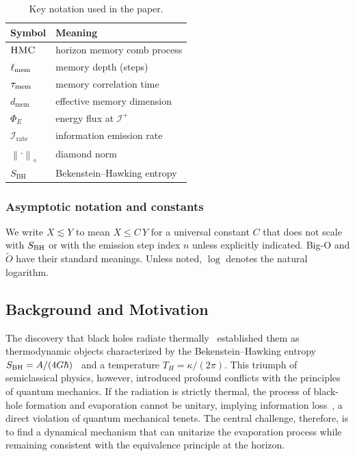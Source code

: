 \documentclass[11pt,a4paper]{article}
\newcommand{\normD}[1]{\left\lVert #1 \right\rVert_{\diamond}}
\newcommand{\Irate}{\mathcal{I}_{\mathrm{rate}}}
\newcommand{\Eflux}{\Phi_E}
\newcommand{\Ddiamond}[1]{\normD{#1}}
\newcommand{\HMC}{\textsc{HMC}\xspace}
\newcommand{\dmem}{\ensuremath{d_{\mathrm{mem}}}}
\newcommand{\SBH}{\ensuremath{S_{\mathrm{BH}}}}
\theoremstyle{plain}
\theoremstyle{definition}
\theoremstyle{remark}
\begin{document}
\begin{table}[t]
  \centering
  \caption{Key notation used in the paper.}
  \label{tab:notation}
  \small
  \begin{tabular*}{\textwidth}{@{\extracolsep{\fill}}ll@{}}
    \toprule
    \textbf{Symbol} & \textbf{Meaning} \\
    \midrule
    $\HMC$ & horizon memory comb process \\
    $\ell_{\rm mem}$ & memory depth (steps) \\
    $\tau_{\rm mem}$ & memory correlation time \\
    $\dmem$ & effective memory dimension \\
    $\Eflux$ & energy flux at $\mathscr{I}^+$ \\
    $\Irate$ & information emission rate \\
    $\Ddiamond{\cdot}$ & diamond norm \\
    $\SBH$ & Bekenstein--Hawking entropy \\
    \bottomrule
  \end{tabular*}
\end{table}

\subsubsection{Asymptotic notation and constants}
We write $X\lesssim Y$ to mean $X\le C\,Y$ for a universal constant $C$ that does not scale with $S_{\rm BH}$
or with the emission step index $n$ unless explicitly indicated. Big-O and $\tilde O$ have their standard
meanings. Unless noted, $\log$ denotes the natural logarithm.

\subsection{Background and Motivation}
The discovery that black holes radiate thermally~\cite{Hawking:1975} established them as thermodynamic objects characterized by the Bekenstein--Hawking entropy $S_{\rm BH} = A/(4G\hbar)$~\cite{Bekenstein:1973} and a temperature $T_H = \kappa/(2\pi)$. This triumph of semiclassical physics, however, introduced profound conflicts with the principles of quantum mechanics. If the radiation is strictly thermal, the process of black\nobreakdash-hole formation and evaporation cannot be unitary, implying information loss~\cite{Hawking:1976}, a direct violation of quantum mechanical tenets. The central challenge, therefore, is to find a dynamical mechanism that can unitarize the evaporation process while remaining consistent with the equivalence principle at the horizon.
\end{document}
